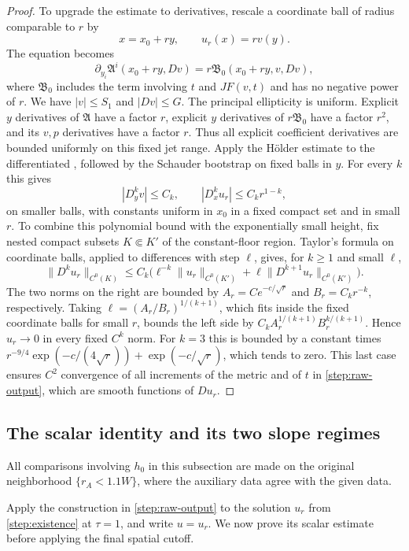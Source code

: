 \begin{proof}
To upgrade the estimate to derivatives, rescale a coordinate ball of
radius comparable to $r$ by
\[
 x=x_0+ry,\qquad u_r(x)=r v(y).
\]
The equation becomes
\begin{equation}\label{step:rescaled}
 \partial_{y_i}\mathfrak A^i(x_0+ry,Dv)
 =r\mathfrak B_0(x_0+ry,v,Dv),
\end{equation}
where $\mathfrak B_0$ includes the term involving $t$ and $JF(v,t)$ and has no
negative power of $r$.  We have $|v|\le S_1$ and $|Dv|\le G$.
The principal ellipticity is uniform.  Explicit $y$ derivatives of
$\mathfrak A$ have a factor $r$, explicit $y$ derivatives of
$r\mathfrak B_0$ have a factor $r^2$, and its $v,p$ derivatives have a
factor $r$.  Thus all explicit coefficient derivatives are bounded
uniformly on this fixed jet range. Apply the H\"older estimate to the
differentiated , followed by the
Schauder bootstrap on fixed balls in $y$. For every $k$ this gives
\[
 |D_y^kv|\le C_k,\qquad |D_x^ku_r|\le C_kr^{1-k},
\]
on smaller balls, with constants uniform in $x_0$ in a fixed compact
set and in small $r$. To combine this polynomial bound with the
exponentially small height, fix nested compact subsets $K\Subset K'$
of the constant-floor region. Taylor's formula on coordinate balls,
applied to differences with step $\ell$, gives, for $k\ge1$ and small $\ell$,
\[
 \|D^ku_r\|_{C^0(K)}
 \le C_k\bigl(\ell^{-k}\|u_r\|_{C^0(K')}
              +\ell\|D^{k+1}u_r\|_{C^0(K')}\bigr).
\]
The two norms on the right are bounded by $A_r=Ce^{-c/\sqrt r}$
and $B_r=C_kr^{-k}$, respectively. Taking
$\ell=(A_r/B_r)^{1/(k+1)}$, which fits inside the fixed coordinate
balls for small $r$, bounds the left side by
$C_kA_r^{1/(k+1)}B_r^{k/(k+1)}$. Hence $u_r\to0$ in every
fixed $C^k$ norm. For $k=3$ this is bounded by a constant times
$r^{-9/4}\exp(-c/(4\sqrt r))+\exp(-c/\sqrt r)$, which tends to zero.  This
last case ensures $C^2$ convergence of all increments of the metric and of \(t\)
in \cref{step:raw-output}, which are smooth functions of $Du_r$.
\end{proof}

\subsection{The scalar identity and its two slope regimes}

All comparisons involving $h_0$ in this subsection are made on the
original neighborhood $\{r_A<1.1W\}$, where the auxiliary data agree
with the given data.

Apply the construction in \cref{step:raw-output} to the solution $u_r$
from \cref{step:existence} at $\tau=1$, and write $u=u_r$. We now prove
its scalar estimate before applying the final spatial cutoff.

